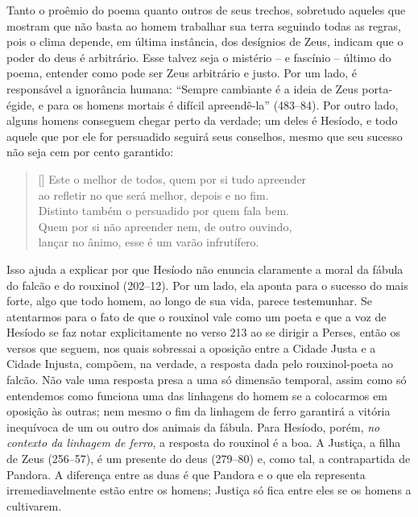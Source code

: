 Tanto o proêmio do poema quanto outros de seus trechos, sobretudo
aqueles que mostram que não basta ao homem trabalhar sua terra seguindo
todas as regras, pois o clima depende, em última instância, dos
desígnios de Zeus, indicam que o poder do deus é arbitrário. Esse
talvez seja o mistério – e fascínio – último do poema, entender como
pode ser Zeus arbitrário e justo. Por um lado, é responsável a
ignorância humana: “Sempre cambiante é a ideia de Zeus porta-égide, e
para os homens mortais é difícil apreendê-la” (483--84). Por outro lado,
alguns homens conseguem chegar perto da verdade; um deles é
Hesíodo, e todo aquele que por ele for persuadido seguirá seus
conselhos, mesmo que seu sucesso não seja cem por cento garantido:

\begin{verse}[\versewidth]
  Este o melhor de todos, quem por si tudo apreender\\
  ao refletir no que será melhor, depois e no fim.\\
  Distinto também o persuadido por quem fala bem.\\
  Quem por si não apreender nem, de outro ouvindo,\\
  lançar no ânimo, esse é um varão infrutífero.
\end{verse}



Isso ajuda a explicar por que Hesíodo não enuncia claramente a moral da
fábula do falcão e do rouxinol (202--12). Por um lado, ela aponta para o
sucesso do mais forte, algo que todo homem, ao longo de sua vida,
parece testemunhar. Se atentarmos para o fato de que o rouxinol vale como
um poeta e que a voz de Hesíodo se faz notar explicitamente no verso
213 ao se dirigir a Perses, então os versos que seguem, nos quais
sobressai a oposição entre a Cidade Justa e a Cidade Injusta, compõem,
na verdade, a resposta dada pelo rouxinol-poeta ao falcão.
Não vale uma resposta presa a uma só dimensão temporal, assim como só
entendemos como funciona uma das linhagens do homem se a colocarmos em
oposição às outras; nem mesmo o fim da linhagem de ferro garantirá a
vitória inequívoca de um ou outro dos animais da fábula. Para Hesíodo,
porém, \textit{no contexto da linhagem de ferro}, a resposta do rouxinol é
a boa. A Justiça, a filha de Zeus (256--57), é um presente do deus
(279--80) e, como tal, a contrapartida de Pandora. A diferença entre as
duas é que Pandora e o que ela representa irremediavelmente estão entre
os homens; Justiça só fica entre eles se os homens a cultivarem.

